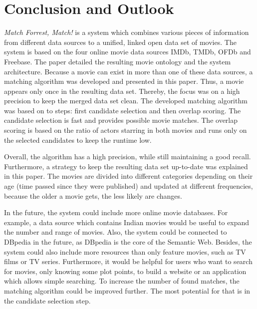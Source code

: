 \section{Conclusion and Outlook}
\label{sec_conclusion}

\emph{Match Forrest, Match!} is a system which combines various pieces of information from different data sources to a unified, linked open data set of movies.
The system is based on the four online movie data sources IMDb, TMDb, OFDb and Freebase.
The paper detailed the resulting movie ontology and the system architecture.
Because a movie can exist in more than one of these data sources, a matching algorithm was developed and presented in this paper.
Thus, a movie appears only once in the resulting data set.
Thereby, the focus was on a high precision to keep the merged data set clean.
The developed matching algorithm was based on to steps: first candidate selection and then overlap scoring.
The candidate selection is fast and provides possible movie matches.
The overlap scoring is based on the ratio of actors starring in both movies and runs only on the selected candidates to keep the runtime low.

Overall, the algorithm has a high precision, while still maintaining a good recall.
Furthermore, a strategy to keep the resulting data set up-to-date was explained in this paper.
The movies are divided into different categories depending on their age (time passed since they were published) and updated at different frequencies, because the older a movie gets, the less likely are changes.

In the future, the system could include more online movie databases.
For example, a data source which contains Indian movies would be useful to expand the number and range of movies.
Also, the system could be connected to DBpedia in the future, as DBpedia is the core of the Semantic Web.
Besides, the system could also include more resources than only feature movies, such as TV films or TV series.
Furthermore, it would be helpful for users who want to search for movies, only knowing some plot points, to build a website or an application which allows simple searching.
To increase the number of found matches, the matching algorithm could be improved further.
The most potential for that is in the candidate selection step.
